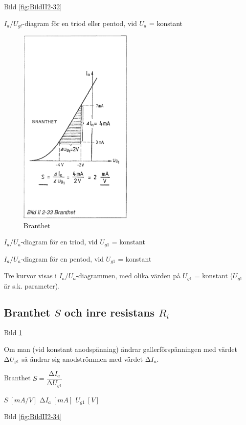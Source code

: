 Bild \ref{fig:BildII2-32}

\(I_a/U_{gt}\)-diagram för en triod eller pentod, vid \(U_a\) = konstant

\begin{figure}
\includegraphics[width=0.5\textwidth]{images/bild_2_2-33}
\caption{Branthet}
\label{fig:BildII2-33}
\end{figure}

\(I_a/U_a\)-diagram för en triod, vid \(U_{g1}\) = konstant

\(I_a/U_a\)-diagram för en pentod, vid \(U_{g1}\) = konstant

Tre kurvor visas i \(I_a/U_a\)-diagrammen, med olika värden på
\(U_{g1}\) = konstant (\(U_{g1}\) är s.k. parameter).

\subsection{Branthet \(S\) och inre resistans \(R_i\)}

Bild \ref{fig:BildII2-33}

Om man (vid konstant anodspänning) ändrar gallerförspänningen med värdet
\(∆U_{g1}\) så ändrar sig anodströmmen med värdet \(∆I_a\).

Branthet \(S = \dfrac{∆I_a}{∆U_{g1}}\)

\(S\ [mA/V]\) \(∆I_a\ [mA]\) \(U_{g1}\ [V]\)

Bild \ref{fig:BildII2-34}

